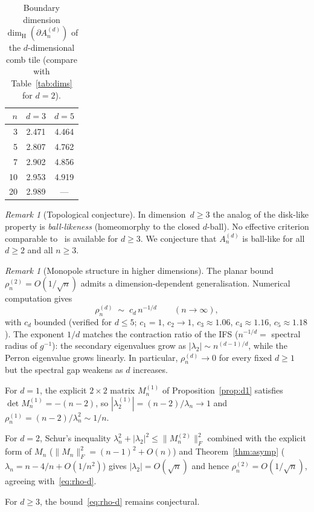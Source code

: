 \documentclass{amsart}
\theoremstyle{definition}
\theoremstyle{remark}
\newtheorem{remark}[theorem]{Remark}
\newcommand{\dH}{\dim_{\mathrm{H}}}
\begin{document}
\begin{table}[h]
\centering
\caption{Boundary dimension $\dH(\partial A_n^{(d)})$ of the
  $d$-dimensional comb tile
  (compare with Table~\ref{tab:dims} for $d = 2$).}
\label{tab:dims-d}
\begin{tabular}{rcc}
\toprule
$n$ & $d = 3$ & $d = 5$ \\
\midrule
  3 & 2.471 & 4.464 \\
  5 & 2.807 & 4.762 \\
  7 & 2.902 & 4.856 \\
 10 & 2.953 & 4.919 \\
 20 & 2.989 & --- \\
\bottomrule
\end{tabular}
\end{table}

\begin{remark}[Topological conjecture]
In dimension~$d \ge 3$ the analog of the disk-like property is
\emph{ball-likeness} (homeomorphy to the closed $d$-ball).
No effective criterion comparable
to~\cite{loridant-luo-thuswaldner} is available for $d \ge 3$.
We conjecture that $A_n^{(d)}$ is ball-like for all $d \ge 2$
and all $n \ge 3$.
\end{remark}

\begin{remark}[Monopole structure in higher dimensions]
\label{ssec:monopole-d}
The planar bound $\rho_n^{(2)} = O(1/\sqrt n)$ admits a
dimension-dependent generalisation.  Numerical computation gives
\begin{equation}\label{eq:rho-d}
  \rho_n^{(d)} \;\sim\; c_d\, n^{-1/d}
  \qquad (n \to \infty),
\end{equation}
with $c_d$ bounded (verified for $d \le 5$;
$c_1 = 1$, $c_2 \to 1$, $c_3 \approx 1.06$, $c_4 \approx 1.16$,
$c_5 \approx 1.18$).
The exponent $1/d$ matches the contraction ratio of the IFS
($n^{-1/d} = $ spectral radius of $g^{-1}$): the secondary
eigenvalues grow as $|\lambda_2| \sim n^{(d-1)/d}$, while the
Perron eigenvalue grows linearly.  In particular, $\rho_n^{(d)} \to 0$
for every fixed $d \ge 1$ but the spectral gap weakens as
$d$ increases.

For $d = 1$, the explicit $2 \times 2$ matrix $M_n^{(1)}$ of
Proposition~\ref{prop:d1} satisfies $\det M_n^{(1)} = -(n{-}2)$,
so $|\lambda_2^{(1)}| = (n{-}2)/\lambda_n \to 1$ and
$\rho_n^{(1)} = (n{-}2)/\lambda_n^2 \sim 1/n$.

For $d = 2$, Schur's inequality
$\lambda_n^2 + |\lambda_2|^2 \le \|M_n^{(2)}\|_F^2$
combined with the explicit form of $M_n$
($\|M_n\|_F^2 = (n{-}1)^2 + O(n)$) and Theorem~\ref{thm:asymp}
($\lambda_n = n - 4/n + O(1/n^2)$) gives
$|\lambda_2| = O(\sqrt n)$ and hence $\rho_n^{(2)} = O(1/\sqrt n)$,
agreeing with~\eqref{eq:rho-d}.

For $d \ge 3$, the bound~\eqref{eq:rho-d} remains conjectural.
\end{remark}
\end{document}
